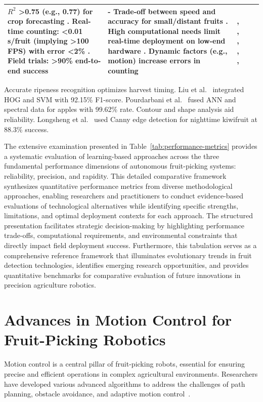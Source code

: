 \documentclass{ieeeaccess}
\begin{document}
\begin{table}[htbp]
\begin{tabular}{@{}p{1.5cm}p{2.5cm}p{5cm}p{4cm}p{2.5cm}@{}}
$R^2$ >0.75 (e.g., 0.77) for crop forecasting \cite{underwood2016mapping}. Real-time counting: <0.01 s/fruit (implying >100 FPS) with error <2\% \cite{altaheri2019date}. Field trials: >90\% end-to-end success \cite{birrell2020field} & - Trade-off between speed and accuracy for small/distant fruits \cite{kang2020real}. High computational needs limit real-time deployment on low-end hardware \cite{altaheri2019date}. Dynamic factors (e.g., motion) increase errors in counting \cite{underwood2016mapping} & \cite{underwood2016mapping}, \cite{lin2019guava}, \cite{kang2019fruit}, \cite{kang2020real}, \cite{altaheri2019date}, \cite{birrell2020field} \\ \bottomrule
\end{tabular}
\end{table}
\fi

Accurate ripeness recognition optimizes harvest timing. 
Liu et al.~\cite{liu2019mature} integrated HOG and SVM with 92.15\% F1-score. 
Pourdarbani et al.~\cite{pourdarbani2020automatic} fused ANN and spectral data for apples with 99.62\% rate.
Contour and shape analysis aid reliability. 
Longsheng et al.~\cite{longsheng2015kiwifruit} used Canny edge detection for nighttime kiwifruit at 88.3\% success.


The extensive examination presented in Table~\ref{tab:performance-metrics} provides a systematic evaluation of learning-based approaches across the three fundamental performance dimensions of autonomous fruit-picking systems: reliability, precision, and rapidity. This detailed comparative framework synthesizes quantitative performance metrics from diverse methodological approaches, enabling researchers and practitioners to conduct evidence-based evaluations of technological alternatives while identifying specific strengths, limitations, and optimal deployment contexts for each approach. The structured presentation facilitates strategic decision-making by highlighting performance trade-offs, computational requirements, and environmental constraints that directly impact field deployment success. Furthermore, this tabulation serves as a comprehensive reference framework that illuminates evolutionary trends in fruit detection technologies, identifies emerging research opportunities, and provides quantitative benchmarks for comparative evaluation of future innovations in precision agriculture robotics.

\section{Advances in Motion Control for Fruit-Picking Robotics}
Motion control is a central pillar of fruit-picking robots, essential for ensuring precise and efficient operations in complex agricultural environments. Researchers have developed various advanced algorithms to address the challenges of path planning, obstacle avoidance, and adaptive motion control~\cite{Ahmad:2023_bnb, Loganathan:2024_hho_avoa, Teo:2020, Arrouch:2022b, 10746490}.
\end{document}
